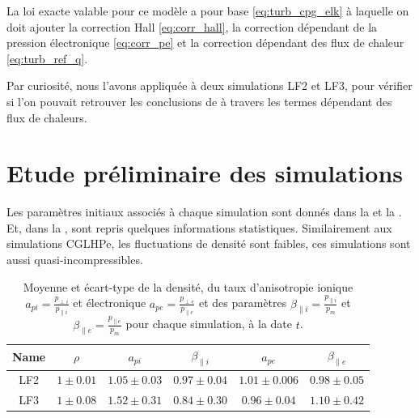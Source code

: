 La loi exacte valable pour ce modèle a pour base \eqref{eq:turb_cpg_elk} à laquelle on doit ajouter la correction Hall \eqref{eq:corr_hall}, la correction dépendant de la pression électronique \eqref{eq:corr_pe} et la correction dépendant des flux de chaleur \eqref{eq:turb_ref_q}. 

Par curiosité, nous l'avons appliquée à deux simulations LF2 et LF3, pour vérifier si l'on pouvait retrouver les conclusions de \cite{ferrand_fluid_2021} à travers les termes dépendant des flux de chaleurs. 

\section{Etude préliminaire des simulations}
\label{sec-342}

Les paramètres initiaux associés à chaque simulation sont donnés dans la  et la . Et, dans la , sont repris quelques informations statistiques. Similairement aux simulations \acs{CGLHPe}, les fluctuations de densité  sont faibles, ces simulations sont aussi quasi-incompressibles. 
 \begin{table}[!ht]
\begin{center}
\begin{tabular}{ c|c|c|c|c|c } 
Name & $\rho$ & $a_{pi}$  & $\beta_{\parallel i }$ & $a_{pe}$  & $\beta_{\parallel e }$\\
\hline
LF2 & $\num{1}\pm \num{0.01}$ & $\num{1.05}\pm \num{0.03}$ & $\num{0.97}\pm \num{0.04}$ & $\num{1.01}\pm \num{0.006}$ & $\num{0.98}\pm \num{0.05}$  \\
LF3 & $\num{1}\pm \num{0.08}$ & $\num{1.52}\pm \num{0.31}$ & $\num{0.84}\pm \num{0.30}$ & $\num{0.96}\pm \num{0.04}$ & $\num{1.10}\pm \num{0.42}$  %
\end{tabular}
\caption{Moyenne et écart-type de la densité, du taux d'anisotropie ionique $a_{pi} = \frac{p_{\perp i}}{p_{\parallel i}}$ et électronique $a_{pe} = \frac{p_{\perp e}}{p_{\parallel e}}$ et des paramètres $\beta_{\parallel i} = \frac{p_{\parallel i}}{p_{m}}$ et $\beta_{\parallel e} = \frac{p_{\parallel e}}{p_{m}}$  pour chaque simulation, à la date $t$. \label{tab:stat_LF}}
\end{center}
\end{table}

